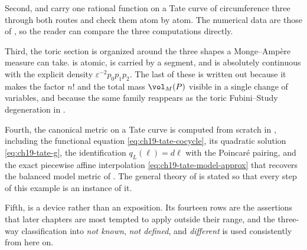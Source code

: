 Second,  and  carry
one rational function on a Tate curve of circumference three through both
routes and check them atom by atom.  The numerical data are those of
, so the reader can compare the three computations
directly.

Third, the toric section is organized around the three shapes a
Monge--Amp\`ere measure can take.   is
atomic,  is carried by a segment, and
 is absolutely continuous with the explicit
density $\varepsilon^{-2}p_0p_1p_2$.  The last of these is written out
because it makes the factor $n!$ and the total mass $\vol_M(P)$ visible
in a single change of variables, and because the same family reappears as
the toric Fubini--Study degeneration in
.

Fourth, the canonical metric on a Tate curve is computed from scratch in
, including the functional equation
\eqref{eq:ch19-tate-cocycle}, its quadratic solution
\eqref{eq:ch19-tate-g}, the identification
$q_L(\ell)=d\ell$ with the Poincar\'e pairing, and the exact
piecewise affine interpolation \eqref{eq:ch19-tate-model-approx} that
recovers the balanced model metric of
.  The general theory of
 is stated so that every step of this example is an
instance of it.

Fifth,  is a device rather than an exposition.
Its fourteen rows are the assertions that later chapters are most tempted to
apply outside their range, and the three-way classification into \emph{not
known}, \emph{not defined}, and \emph{different} is used consistently from
here on.

